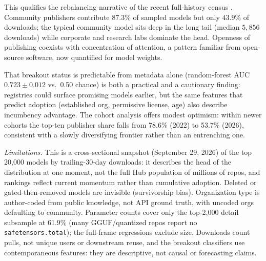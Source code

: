 \documentclass[conference]{IEEEtran}
\begin{document}
This qualifies the rebalancing narrative of the recent full-history census
\cite{econ-open-intel}. Community publishers contribute $87.3\%$ of sampled models but only $43.9\%$ of downloads; the typical community model sits deep
in the long tail (median $5{,}856$ downloads) while corporate and research labs
dominate the head. Openness of publishing coexists with concentration of
attention, a pattern familiar from open-source software, now quantified for
model weights.

That breakout status is predictable from metadata alone (random-forest AUC $0.723\pm0.012$ vs.\ 0.50 chance) is both a practical and a cautionary
finding: registries could surface promising models earlier, but the same
features that predict adoption (established org, permissive license, age)
also describe incumbency advantage. The cohort analysis offers modest
optimism: within newer cohorts the top-ten publisher share falls from 78.6\%
(2022) to 53.7\% (2026),
consistent with a slowly diversifying frontier rather than an
entrenching one.

\emph{Limitations.} This is a cross-sectional snapshot (September 29, 2026)
of the top 20,000 models by trailing-30-day downloads: it describes the
head of the distribution at one moment, not the full Hub population of
millions of repos, and rankings reflect current momentum rather than
cumulative adoption. Deleted or gated-then-removed models are invisible
(survivorship bias). Organization type is author-coded from public knowledge,
not API ground truth, with uncoded orgs defaulting to community. Parameter
counts cover only the top-2,000 detail subsample at 61.9\% (many GGUF/quantized repos report no \texttt{safetensors.total}); the full-frame
regressions exclude size. Downloads count pulls, not unique users or
downstream reuse, and the breakout classifiers use contemporaneous features:
they are descriptive, not causal or forecasting claims.
\end{document}

